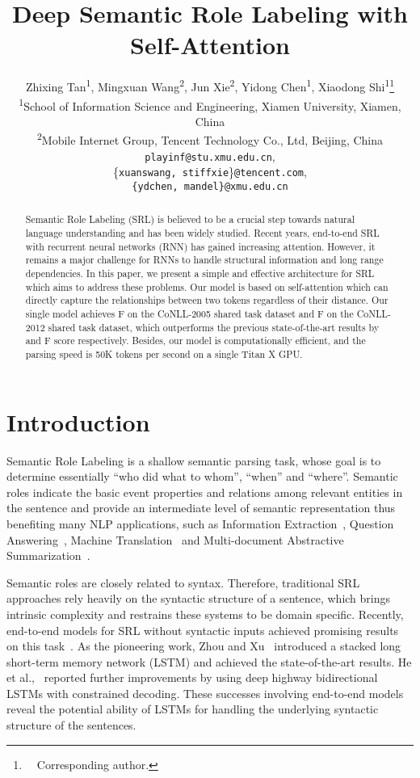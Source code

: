 \documentclass[letterpaper]{article} \usepackage{aaai18}  \usepackage{times}  \usepackage{helvet}  \usepackage{courier}  \usepackage{url}  \usepackage{graphicx}  \frenchspacing  \setlength{\pdfpagewidth}{8.5in}  \setlength{\pdfpageheight}{11in}  \usepackage{latexsym}
\title{Deep Semantic Role Labeling with Self-Attention}
\author{
Zhixing Tan\textsuperscript{1},
Mingxuan Wang\textsuperscript{2},
Jun Xie\textsuperscript{2},
Yidong Chen\textsuperscript{1},
Xiaodong Shi\textsuperscript{1}\thanks{\ \ Corresponding author.}\\
\textsuperscript{1}{School of Information Science and Engineering, Xiamen University, Xiamen, China} \\
\textsuperscript{2}{Mobile Internet Group, Tencent Technology Co., Ltd, Beijing, China} \\
\texttt{playinf@stu.xmu.edu.cn}, \\
\{\texttt{xuanswang, stiffxie}\}\texttt{@tencent.com}, \\
\texttt{\{ydchen, mandel\}@xmu.edu.cn} \\
}
\begin{document}
\maketitle

\begin{abstract}
Semantic Role Labeling (SRL) is believed to be a crucial step towards natural language understanding and has been widely studied. Recent years, end-to-end SRL with recurrent neural networks (RNN) has gained increasing attention. However, it remains a major challenge for RNNs to handle structural information and long range dependencies. In this paper, we present a simple and effective architecture for SRL which aims to address these problems. Our model is based on self-attention which can directly capture the relationships between two tokens regardless of their distance. Our single model achieves F on the CoNLL-2005 shared task dataset and F on the CoNLL-2012 shared task dataset, which outperforms the previous state-of-the-art results by  and  F score respectively. Besides, our model is computationally efficient, and the parsing speed is 50K tokens per second on a single Titan X GPU.
\end{abstract}


\section{Introduction}
Semantic Role Labeling is a shallow semantic parsing task, whose goal is to determine essentially ``who did what to whom'', ``when'' and ``where''. Semantic roles indicate the basic event properties and relations among relevant entities in the sentence and provide an intermediate level of semantic representation thus benefiting many NLP applications, such as Information Extraction~\cite{Bastianelli-Basili-2013}, Question Answering~\cite{Surdeanu-Aarseth-ACL2003,Moschitti-Harabagiu-FLAIRS2003,Shen-Lapata-CONLL2007}, Machine Translation~\cite{knight1994building,ueffing2007transductive,wu2009semantic} and Multi-document Abstractive Summarization~\cite{genest2011framework}.

Semantic roles are closely related to syntax. Therefore, traditional SRL approaches rely heavily on the syntactic structure of a sentence, which brings intrinsic complexity and restrains these systems to be domain specific. Recently, end-to-end models for SRL without syntactic inputs achieved promising results on this task~\cite{zhou2015end,marcheggiani2017simple,he2017deep}. As the pioneering work, Zhou and Xu~ introduced a stacked long short-term memory network (LSTM) and achieved the state-of-the-art results. He et al.,~ reported further improvements by using deep highway bidirectional LSTMs with constrained decoding. These successes involving end-to-end models reveal the potential ability of LSTMs for handling the underlying syntactic structure of the sentences.
\end{document}
